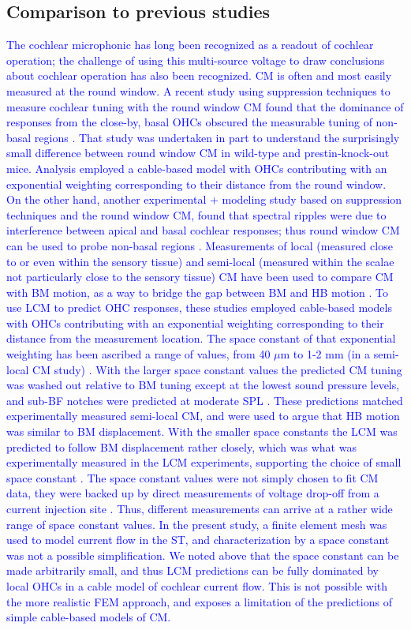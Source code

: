 \documentclass{biophys-new}
\begin{document}
{\subsection{Comparison to previous studies}
\par{\textcolor{blue}{The cochlear microphonic has long been recognized as a readout of cochlear operation; the challenge of using this multi-source voltage to draw conclusions about cochlear operation has also been recognized.  CM is often and most easily measured at the round window. A recent study using suppression techniques to measure cochlear tuning with the round window CM found that the dominance of responses from 
the close-by, basal OHCs obscured the measurable tuning of non-basal regions \cite{cheatham2011}. That study was undertaken in part to understand the surprisingly small difference between round window CM in wild-type and prestin-knock-out mice. Analysis employed a cable-based model with OHCs contributing with an exponential weighting corresponding to their distance from the round window. On the other hand, another experimental + modeling study based on suppression techniques and the round window CM, found that spectral ripples were due to interference between apical and basal cochlear responses; thus round window CM can be used to probe non-basal regions \cite{charaziak2018}. Measurements of local (measured close to or even within the sensory tissue) and semi-local (measured within the scalae not particularly close to the sensory tissue) CM have been used to compare CM with BM motion, as a way to bridge the gap between BM and HB motion \cite{fridberger,patuzzi,dongolson, dallos}.  To use LCM to predict OHC responses, these studies employed cable-based models with OHCs contributing with an exponential weighting corresponding to their distance from the measurement location.  The space constant of that exponential weighting has been ascribed a range of values, from 40 $\mu$m \cite{fridberger} to 1-2 mm (in a semi-local CM study) \cite{patuzzi}. With the larger space constant values the predicted CM tuning was washed out relative to BM tuning except at the lowest sound pressure levels, and sub-BF notches were predicted at moderate SPL \cite{patuzzi}. These predictions matched experimentally measured semi-local CM, and were used to argue that HB motion was similar to BM displacement. With the smaller space constants the LCM was predicted to follow BM displacement rather closely, which was what was experimentally measured in the LCM experiments, supporting the choice of small space constant \cite{fridberger, dongolson}. The space constant values were not simply chosen to fit CM data, they were backed up by direct measurements of voltage drop-off from a current injection site \cite{fridberger, johnstone1966}. Thus, different measurements can arrive at a rather wide range of space constant values.  In the present study, a finite element mesh was used to model current flow in the ST, and characterization by a space constant was not a possible simplification.  We noted above that the space constant can be made arbitrarily small, and thus LCM predictions can be fully dominated by local OHCs in a cable model of cochlear current flow.  This is not possible with the more realistic FEM approach, and exposes a limitation of the predictions of simple cable-based models of CM. } }
}
\end{document}
